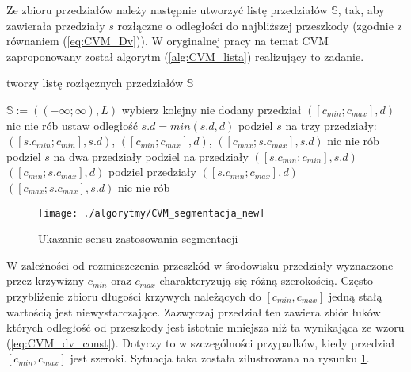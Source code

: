 	Ze zbioru przedziałów należy następnie utworzyć listę przedziałów $\mathbb{S}$, tak, aby zawierała
	przedziały $s$ rozłączne o odległości do najbliższej przeszkody (zgodnie z równaniem (\ref{eq:CVM_Dv})).
	W oryginalnej pracy na temat CVM \cite{CVM_2} zaproponowany został algorytm (\ref{alg:CVM_lista}) realizujący to zadanie.
	\begin{algorithm}
	\caption{tworzy listę rozłącznych przedziałów $\mathbb{S}$}
	\label{alg:CVM_lista}
	\begin{algorithmic}
	\STATE $ \mathbb{S}:= ((-\infty;\infty),L) $
	\STATE  wybierz kolejny nie dodany przedział $([c_{min};c_{max}],d)$
	\STATE nic nie rób
	\STATE ustaw odległość $s.d= min(s.d,d) $
		\STATE podziel $s$ na trzy przedziały: \\$([s.c_{min};c_{min}],s.d)$, $([c_{min};c_{max}],d)$, $([c_{max};s.c_{max}],s.d)$ 
		\ELSE
		\STATE nic nie rób
		\ENDIF
		\STATE podziel $s$ na dwa przedziały
			\STATE podziel na przedziały $([s.c_{min};c_{min}],s.d)$ $([c_{min};s.c_{max}],d)$
			\ELSE
			\STATE podziel przedziały $([s.c_{min};c_{max}],d)$ $([c_{max};s.c_{max}],s.d)$
			\ENDIF
		\ELSE
		\STATE nic nie rób
		\ENDIF
	\ENDIF
	\ENDFOR
	\end{algorithmic}
	\end{algorithm}
	\begin{figure}[H]
	\centering
	\texttt{[image: ./algorytmy/CVM\_segmentacja\_new]}
	\caption{ Ukazanie sensu zastosowania segmentacji} \label{fig:CVM_segmentacja}
	\end{figure}
	W zależności od rozmieszczenia przeszkód w środowisku przedziały wyznaczone przez krzywizny $c_{min}$ oraz $c_{max}$ charakteryzują się różną szerokością. Często przybliżenie zbioru długości krzywych należących do
	$[c_{min},c_{max}]$ jedną stałą wartością jest niewystarczające. Zazwyczaj przedział ten zawiera zbiór łuków których odległość od przeszkody jest istotnie mniejsza niż ta wynikająca ze wzoru (\ref{eq:CVM_dv_const}).
	Dotyczy to w szczególności przypadków, kiedy przedział $[c_{min},c_{max}]$ jest szeroki. Sytuacja taka została zilustrowana na rysunku \ref{fig:CVM_segmentacja}.
	

